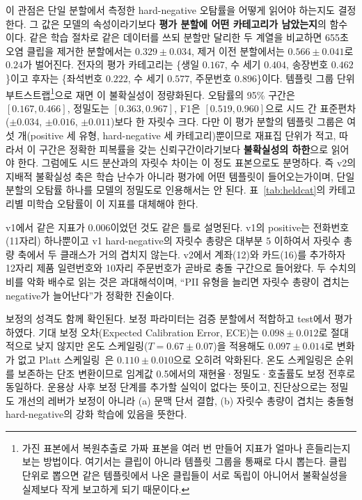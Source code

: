 \documentclass[10pt,twocolumn]{article}
\renewcommand{\emph}[1]{\textbf{#1}}
\begin{document}
이 관점은 단일 분할에서 측정한 hard-negative 오탐률을 어떻게 읽어야 하는지도 결정한다. 그 값은
모델의 속성이라기보다 \emph{평가 분할에 어떤 카테고리가 남았는지}의 함수이다. 같은 학습 절차로
같은 데이터를 쓰되 분할만 달리한 두 계열을 비교하면 655초 오염 클립을 제거한 분할에서는
$0.329\pm0.034$, 제거 이전 분할에서는 $0.566\pm0.041$로 $0.24$가 벌어진다. 전자의 평가
카테고리는 \{생일 $0.167$, 수 세기 $0.404$, 송장번호 $0.462$\}이고 후자는 \{좌석번호 $0.222$,
수 세기 $0.577$, 주문번호 $0.896$\}이다. 템플릿 그룹 단위 부트스트랩\footnote{가진 표본에서 복원추출로 가짜 표본을 여러 번 만들어
지표가 얼마나 흔들리는지 보는 방법이다. 여기서는 클립이 아니라 템플릿 그룹을 통째로 다시
뽑는다. 클립 단위로 뽑으면 같은 템플릿에서 나온 클립들이 서로 독립이 아니어서 불확실성을
실제보다 작게 보고하게 되기 때문이다.}으로 재면 이 불확실성이 정량화된다. 오탐률의 95\% 구간은 $[0.167, 0.466]$, 정밀도는 $[0.363, 0.967]$, F1은
$[0.519, 0.960]$으로 시드 간 표준편차($\pm0.034$, $\pm0.016$, $\pm0.011$)보다 한 자릿수 크다.
다만 이 평가 분할의 템플릿 그룹은 여섯 개(positive 세 유형, hard-negative 세 카테고리)뿐이므로
재표집 단위가 적고, 따라서 이 구간은 정확한 피복률을 갖는 신뢰구간이라기보다 \emph{불확실성의
하한}으로 읽어야 한다. 그럼에도 시드 분산과의 자릿수 차이는 이 정도 표본으로도 분명하다. 즉
v2의 지배적 불확실성 축은 학습 난수가 아니라 평가에 어떤 템플릿이 들어오는가이며, 단일 분할의
오탐률 하나를 모델의 정밀도로 인용해서는 안 된다. 표~\ref{tab:heldcat}의 카테고리별 미학습
오탐률이 이 지표를 대체해야 한다.

v1에서 같은 지표가 $0.006$이었던 것도 같은 틀로 설명된다. v1의 positive는 전화번호(11자리)
하나뿐이고 v1 hard-negative의 자릿수 총량은 대부분 5 이하여서 자릿수 총량 축에서 두 클래스가
거의 겹치지 않는다. v2에서 계좌(12)와 카드(16)를 추가하자 12자리 제품 일련번호와 10자리
주문번호가 곧바로 충돌 구간으로 들어왔다. 두 수치의 비를 악화 배수로 읽는 것은 과대해석이며,
``PII 유형을 늘리면 자릿수 총량이 겹치는 negative가 늘어난다''가 정확한 진술이다.

보정의 성격도 함께 확인된다. 보정 파라미터는 검증 분할에서 적합하고 test에서 평가하였다. 기대
보정 오차(Expected Calibration Error, ECE)는 $0.098\pm0.012$로 절대적으로 낮지 않지만 온도
스케일링($T=0.67\pm0.07$)을 적용해도 $0.097\pm0.014$로 변화가 없고 Platt
스케일링~\cite{guo2017calibration}은 $0.110\pm0.010$으로 오히려 악화된다. 온도 스케일링은 순위를
보존하는 단조 변환이므로 임계값 0.5에서의 재현율·정밀도·호출률도 보정 전후로 동일하다. 운용상
사후 보정 단계를 추가할 실익이 없다는 뜻이고, 진단상으로는 정밀도 개선의 레버가 보정이 아니라
(a) 문맥 단서 결합, (b) 자릿수 총량이 겹치는 충돌형 hard-negative의 강화 학습에 있음을 뜻한다.
\end{document}
